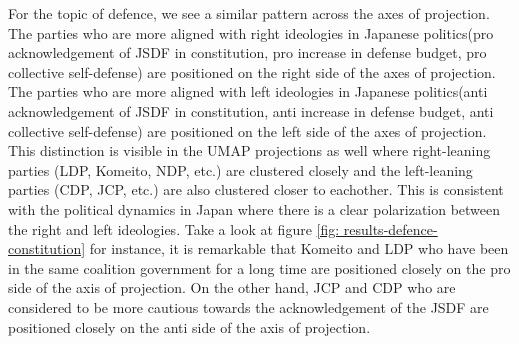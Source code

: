 \documentclass[final,5p,times,twocolumn,authoryear]{elsarticle}
\begin{document}
For the topic of defence, we see a similar pattern across the axes of projection. The parties who are more aligned with right ideologies in Japanese politics(pro acknowledgement of JSDF in constitution, pro increase in defense budget, pro collective self-defense) are positioned on the right side of the axes of projection. The parties who are more aligned with left ideologies in Japanese politics(anti acknowledgement of JSDF in constitution, anti increase in defense budget, anti collective self-defense) are positioned on the left side of the axes of projection. This distinction is visible in the UMAP projections as well where right-leaning parties (LDP, Komeito, NDP, etc.) are clustered closely and the left-leaning parties (CDP, JCP, etc.) are also clustered closer to eachother. This is consistent with the political dynamics in Japan where there is a clear polarization between the right and left ideologies. Take a look at figure \ref{fig: results-defence-constitution} for instance, it is remarkable that Komeito and LDP who have been in the same coalition government for a long time are positioned closely on the pro side of the axis of projection. On the other hand, JCP and CDP who are considered to be more cautious towards the acknowledgement of the JSDF are positioned closely on the anti side of the axis of projection.
\end{document}
